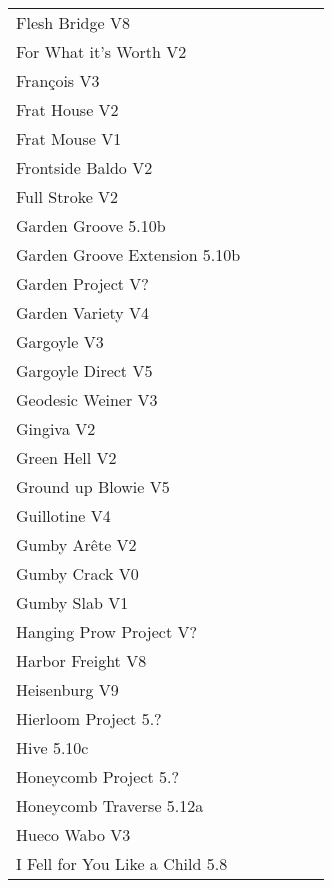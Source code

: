 \begin{flushleft}
\begin{center}
\begin{supertabular}{p{0.76\linewidth}p{0.08\linewidth}}
Flesh Bridge V8 & \pageref{rt:Flesh Bridge} \\
For What it's Worth V2 & \pageref{rt:For What it's Worth} \\
François V3 & \pageref{rt:François} \\
Frat House V2 & \pageref{rt:Frat House} \\
Frat Mouse V1 & \pageref{rt:Frat Mouse} \\
Frontside Baldo V2 & \pageref{rt:Frontside Baldo} \\
Full Stroke V2 & \pageref{rt:Full Stroke} \\
Garden Groove 5.10b & \pageref{rt:Garden Groove} \\
Garden Groove Extension 5.10b & \pageref{vr:Garden Groove Extension} \\
Garden Project V? & \pageref{rt:Garden Project} \\
Garden Variety V4 & \pageref{rt:Garden Variety} \\
Gargoyle V3 & \pageref{rt:Gargoyle} \\
Gargoyle Direct V5 & \pageref{vr:Gargoyle Direct} \\
Geodesic Weiner V3 & \pageref{rt:Geodesic Weiner} \\
Gingiva V2 & \pageref{rt:Gingiva} \\
Green Hell V2 & \pageref{rt:Green Hell} \\
Ground up Blowie V5 & \pageref{rt:Ground up Blowie} \\
Guillotine V4 & \pageref{rt:Guillotine} \\
Gumby Arête V2 & \pageref{rt:Gumby Arête} \\
Gumby Crack V0 & \pageref{rt:Gumby Crack} \\
Gumby Slab V1 & \pageref{rt:Gumby Slab} \\
Hanging Prow Project V? & \pageref{rt:Hanging Prow Project} \\
Harbor Freight V8 & \pageref{vr:Harbor Freight} \\
Heisenburg V9 & \pageref{rt:Heisenburg} \\
Hierloom Project 5.? & \pageref{rt:Hierloom Project} \\
Hive 5.10c & \pageref{rt:Hive} \\
Honeycomb Project 5.? & \pageref{rt:Honeycomb Project} \\
Honeycomb Traverse 5.12a & \pageref{vr:Honeycomb Traverse} \\
Hueco Wabo V3 & \pageref{rt:Hueco Wabo} \\
I Fell for You Like a Child 5.8 & \pageref{rt:I Fell for You Like a Child} \\

\end{supertabular}
\end{center}
\end{flushleft}
